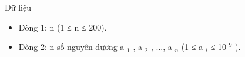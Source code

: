 Dữ liệu
\begin{itemize}
	\item     Dòng 1: n (1 ≤ n ≤ 200).   
	\item     Dòng 2: n số nguyên dương a    $_     1    $    , a    $_     2    $    , ..., a    $_     n    $    (1 ≤ a    $_     i    $    ≤ 10    $^     9    $    ).   
\end{itemize}